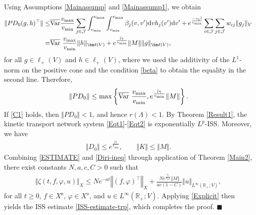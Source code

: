 \documentclass[onecolumn]{autart}
\def\R{{\mathbb{R}}}
\def\R{\mathbb R}
\numberwithin{equation}{section}
\newenvironment{proof}{{\it Proof: \enspace}}{\hfill $\blacksquare$\par}
\begin{document}
	\begin{proof}
		Using Assumptions \ref{Mainassump} and \ref{Mainassump1}, we obtain
		{\small
        \begin{align*}
			\Vert PD_0(g, h)^{\top}\Vert
			\le & \overline{{\rm Var}} \frac{v_{\max}}{v_{\min}}\sum_{j\in \mathcal{J}}\int_{v_{\min}}^{v_{\max}}\int_{v_{\min}}^{v_{\max}}\beta_j(v,v'){\rm d}vh_j(v')  {\rm d}v'
			+e^{\frac{-\gamma_1 \bar{l}}{v_{\min}}}\sum_{i\in \mathcal{J}}\sum_{j\in \mathcal{J}} w_{ij}\Vert g_j\Vert_V\\
			=& \overline{{\rm Var}}\ \frac{v_{\max}}{v_{\min}}\Vert h\Vert_{{\bm \ell}(V)}
			+ e^{\frac{ \bar{l}\bar{\gamma}}{v_{\min}}}\Vert M \Vert\Vert g\Vert_{{{\bm \ell}}(V)},
		\end{align*}}for all $g\in {\bm \ell}_+(V)$ and $h\in {\bm \ell}_+(V)$,
		where we used the additivity of the $L^1$-norm on the positive cone and the condition \eqref{beta} to obtain the equality in the second line. Therefore,
		\begin{align}\label{ESTIMATE}
			\Vert PD_0 \Vert\le \max\left\{\overline{{\rm Var}}\ \frac{v_{\max}}{v_{\min}},e^{\frac{ \bar{l}\bar{\gamma}}{v_{\min}}}\Vert M \Vert\right\}.
		\end{align}
		If \eqref{C1} holds, then $\Vert PD_0\Vert<1$, and hence $r(\Lambda)<1$. By Theorem \ref{Result1}, the kinetic transport network system \eqref{Eqt1}-\eqref{Eqt2} is exponentially $L^p$-ISS. Moreover, we have
		\begin{align}\label{Diri-ineq}
			\Vert D_0\Vert\le e^{\frac{ \bar{l}\bar{\gamma}}{v_{\min}}},\qquad \Vert K\Vert\le \Vert M \Vert.
		\end{align}
		Combining \eqref{ESTIMATE} and \eqref{Diri-ineq} through application of Theorem \ref{Main2}, there exist constants $N,a,c,C>0$ such that
		\begin{align*}%
			\Vert \zeta(t,f,\varphi,u)\Vert_{X}\le Ne^{-a t}\left\Vert (f,\varphi)^\top\right\Vert_{X}+\frac{N e^{\frac{ \bar{l}\bar{\gamma}}{v_{\min}}}\Vert M \Vert}{ac(1-C)}\Vert u\Vert_{L^\infty(\R_+;V)},
		\end{align*}
		for all $t\ge 0$, $f\in X^{\mathsf{e}}$, $\varphi\in X^{o}$, and $u\in L^\infty(\R_+;V)$. Applying \eqref{Explicit} then yields the ISS estimate \eqref{ISS-estimate-trp}, which completes the proof.
	\end{proof}
	
\end{document}
